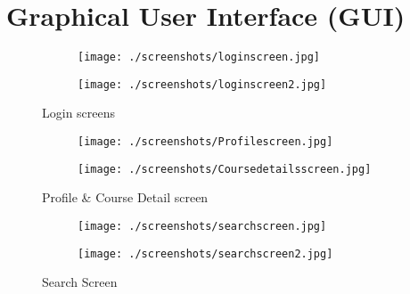 \section{Graphical User Interface (GUI)} 

\begin{figure}[h!]
    \centering
    \begin{subfigure}{.5\textwidth}
      \centering
      \texttt{[image: ./screenshots/loginscreen.jpg]}
      \label{fig:loginscreen}
    \end{subfigure}%
    \begin{subfigure}{.5\textwidth}
      \centering
      \texttt{[image: ./screenshots/loginscreen2.jpg]}
      \label{fig:loginscrren2}
    \end{subfigure}
    \caption{Login screens}
    \label{fig:loginscreens}
    \end{figure}

    \begin{figure}[h!]
        \centering
        \begin{subfigure}{.5\textwidth}
          \centering
          \texttt{[image: ./screenshots/Profilescreen.jpg]}
          \label{fig:profilescreen}
        \end{subfigure}%
        \begin{subfigure}{.5\textwidth}
          \centering
          \texttt{[image: ./screenshots/Coursedetailsscreen.jpg]}
          \label{fig:corursedeatilscreen}
        \end{subfigure}
        \caption{Profile \& Course Detail screen}
        \label{fig: profileandcourse}
        \end{figure}

    \begin{figure}[h!]
        \centering
        \begin{subfigure}{.5\textwidth}
          \centering
          \texttt{[image: ./screenshots/searchscreen.jpg]}
          \label{fig:searchscreen}
        \end{subfigure}%
        \begin{subfigure}{.5\textwidth}
          \centering
          \texttt{[image: ./screenshots/searchscreen2.jpg]}
          \label{fig:searchscreen2}
        \end{subfigure}
        \caption{Search Screen}
        \label{fig:searchscreens}
        \end{figure}

